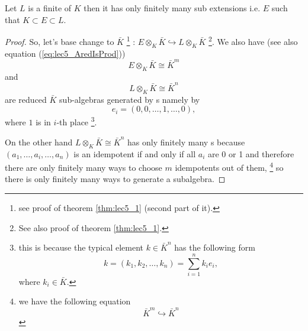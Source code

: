 \begin{theorem}
  Let $L$ is a finite  of $K$ then it
  has only finitely many sub extensions i.e. $E$ such that $K \subset
  E \subset L$.
  \begin{proof}
    So, let's base change to $\bar{K}$
    \footnote {
      see proof of theorem \ref{thm:lec5_1} (second part of it).
    }  
    :
    \(
    E \otimes_{K} \bar{K} \hookrightarrow
    L \otimes_{K} \bar{K}
    \)
    \footnote{
      See also proof of theorem \ref{thm:lec5_1}.
    }.
    We also have (see also equation (\ref{eq:lec5_AredIsProd}))
    \[
    E \otimes_{K} \bar{K} \cong \bar{K}^m
    \]
    and
    \[
    L \otimes_{K} \bar{K} \cong \bar{K}^n
    \]
    are reduced $\bar{K}$ sub-algebras generated by
    s namely by
    \[
    e_i = \left(0,0, \dots, 1, \dots, 0\right),
    \]
    where $1$ is in $i$-th place
    \footnote{
      this is because the typical element $k \in \bar{K}^n$ has the
      following form
      \[
      k = \left(k_1, k_2, \dots, k_n\right) = \sum_{i=1}^n k_i e_i,
      \]
      where $k_i \in \bar{K}$. 
    }.

    On the other hand $L \otimes_K \bar{K} \cong \bar{K}^n$ has only
    finitely many s because 
    $\left(a_1, \dots, a_i, \dots, a_n\right)$ is an idempotent if and
    only if all $a_i$ are 0 or 1 and therefore there
    are only finitely many ways to choose $m$ idempotents out of them,
    \footnote{
      we have the following equation
      \[
      \bar{K}^m \hookrightarrow \bar{K}^n
      \]
    }
    so there is only finitely many ways to generate a subalgebra.  
  \end{proof}
  \label{thm:primitiveelement}
\end{theorem}


